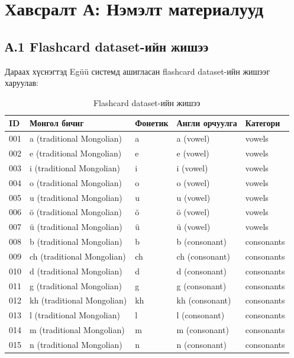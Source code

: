 
\section*{Хавсралт А: Нэмэлт материалууд}

\subsection*{А.1 Flashcard dataset-ийн жишээ}

Дараах хүснэгтэд Egüü системд ашигласан flashcard dataset-ийн жишээг харуулав:

\begin{table}[H]
\centering
\caption{Flashcard dataset-ийн жишээ}
\label{tab:flashcard-dataset-sample}
\begin{tabular}{|l|l|l|l|l|}
\hline
\textbf{ID} & \textbf{Монгол бичиг} & \textbf{Фонетик} & \textbf{Англи орчуулга} & \textbf{Категори} \\
\hline
001 & a (traditional Mongolian) & a & a (vowel) & vowels \\
\hline
002 & e (traditional Mongolian) & e & e (vowel) & vowels \\
\hline
003 & i (traditional Mongolian) & i & i (vowel) & vowels \\
\hline
004 & o (traditional Mongolian) & o & o (vowel) & vowels \\
\hline
005 & u (traditional Mongolian) & u & u (vowel) & vowels \\
\hline
006 & ö (traditional Mongolian) & ö & ö (vowel) & vowels \\
\hline
007 & ü (traditional Mongolian) & ü & ü (vowel) & vowels \\
\hline
008 & b (traditional Mongolian) & b & b (consonant) & consonants \\
\hline
009 & ch (traditional Mongolian) & ch & ch (consonant) & consonants \\
\hline
010 & d (traditional Mongolian) & d & d (consonant) & consonants \\
\hline
011 & g (traditional Mongolian) & g & g (consonant) & consonants \\
\hline
012 & kh (traditional Mongolian) & kh & kh (consonant) & consonants \\
\hline
013 & l (traditional Mongolian) & l & l (consonant) & consonants \\
\hline
014 & m (traditional Mongolian) & m & m (consonant) & consonants \\
\hline
015 & n (traditional Mongolian) & n & n (consonant) & consonants \\
\hline
\end{tabular}
\end{table}

